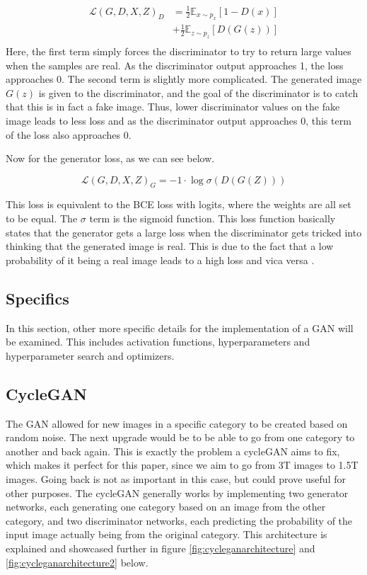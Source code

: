 \documentclass[12pt, fleqn, titlepage]{article}
\begin{document}
\[\begin{aligned}
	\mathcal{L}\left(G, D, X, Z\right)_D &=\frac{1}{2} \mathbb{E}_{x \sim p_{x}}[1-D(x)] \\
	&+\frac{1}{2} \mathbb{E}_{z \sim p_{z}}[D(G(z))] \\
\end{aligned}\]
Here, the first term simply forces the discriminator to try to return large values when the samples are real. As the discriminator output approaches 1, the loss approaches 0. The second term is slightly more complicated. The generated image $G(z)$ is given to the discriminator, and the goal of the discriminator is to catch that this is in fact a fake image. Thus, lower discriminator values on the fake image leads to less loss and as the discriminator output approaches 0, this term of the loss also approaches 0.

Now for the generator loss, as we can see below.

\[\mathcal{L}\left(G, D, X, Z\right)_G=-1 \cdot \log \sigma\left(D(G(Z))\right)\]

This loss is equivalent to the BCE loss with logits, where the weights are all set to be equal. The $\sigma$ term is the sigmoid function. This loss function basically states that the generator gets a large loss when the discriminator gets tricked into thinking that the generated image is real. This is due to the fact that a low probability of it being a real image leads to a high loss and vica versa \cite{bcewithlogits}.

\subsection{Specifics}
In this section, other more specific details for the implementation of a GAN will be examined. This includes activation functions, hyperparameters and hyperparameter search and optimizers.

\subsection{CycleGAN}
The GAN allowed for new images in a specific category to be created based on random noise. The next upgrade would be to be able to go from one category to another and back again. This is exactly the problem a cycleGAN aims to fix, which makes it perfect for this paper, since we aim to go from 3T images to 1.5T images. Going back is not as important in this case, but could prove useful for other purposes. The cycleGAN generally works by implementing two generator networks, each generating one category based on an image from the other category, and two discriminator networks, each predicting the probability of the input image actually being from the original category. This architecture is explained and showcased further in figure \ref{fig:cycleganarchitecture} and \ref{fig:cycleganarchitecture2} below.
\end{document}
